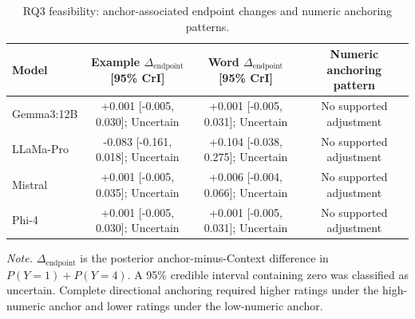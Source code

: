 \begin{table}[tbp]
\caption{RQ3 feasibility: anchor-associated endpoint changes and numeric anchoring patterns.}
\label{tab:rq3_feasibility_anchor_patterns}
\begin{tabular}{lccc}
\toprule
Model & Example $\Delta_{\mathrm{endpoint}}$ [95\% CrI] & Word $\Delta_{\mathrm{endpoint}}$ [95\% CrI] & Numeric anchoring pattern \\
\midrule
Gemma3:12B & +0.001 [-0.005, 0.030]; Uncertain & +0.001 [-0.005, 0.031]; Uncertain & No supported adjustment \\
LLaMa-Pro & -0.083 [-0.161, 0.018]; Uncertain & +0.104 [-0.038, 0.275]; Uncertain & No supported adjustment \\
Mistral & +0.001 [-0.005, 0.035]; Uncertain & +0.006 [-0.004, 0.066]; Uncertain & No supported adjustment \\
Phi-4 & +0.001 [-0.005, 0.030]; Uncertain & +0.001 [-0.005, 0.031]; Uncertain & No supported adjustment \\
\bottomrule
\end{tabular}
\vspace{2pt}
\begin{minipage}{\linewidth}
\footnotesize\textit{Note.} $\Delta_{\mathrm{endpoint}}$ is the posterior anchor-minus-Context difference in $P(Y=1)+P(Y=4)$. A 95\% credible interval containing zero was classified as uncertain. Complete directional anchoring required higher ratings under the high-numeric anchor and lower ratings under the low-numeric anchor.
\end{minipage}
\end{table}
